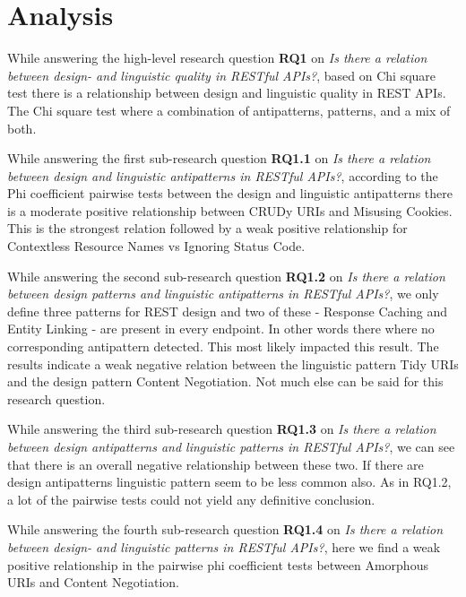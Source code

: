 \section{Analysis}

While answering the high-level research question  \textbf{RQ1} on \textit{Is there a relation between design- and linguistic quality in RESTful APIs?}, based on Chi square test there is a relationship between design and linguistic quality in REST APIs. The Chi square test where a combination of antipatterns, patterns, and a mix of both.

While answering the first sub-research question \textbf{RQ1.1} on \textit{Is there a relation between design and linguistic antipatterns in RESTful APIs?}, according to the Phi coefficient pairwise tests between the design and linguistic antipatterns there is a moderate positive relationship between CRUDy URIs and Misusing Cookies. This is the strongest relation followed by a weak positive relationship for Contextless Resource Names vs Ignoring Status Code.

While answering the second sub-research question \textbf{RQ1.2} on \textit{Is there a relation between design patterns and linguistic antipatterns in RESTful APIs?}, we only define three patterns for REST design and two of these - Response Caching and  Entity Linking - are present in every endpoint. In other words there where no corresponding antipattern detected. This most likely impacted this result. The results indicate a weak negative relation between the linguistic pattern Tidy URIs and the design pattern Content Negotiation. Not much else can be said for this research question.

While answering the third sub-research question  \textbf{RQ1.3} on \textit{Is there a relation between design antipatterns and linguistic patterns in RESTful APIs?}, we can see that there is an overall negative relationship between these two. If there are design antipatterns linguistic pattern seem to be less common also. As in RQ1.2, a lot of the pairwise tests could not yield any definitive conclusion.

While answering the fourth sub-research question \textbf{RQ1.4} on \textit{Is there a relation between design- and linguistic patterns in RESTful APIs?}, here we find a weak positive relationship in the pairwise phi coefficient tests between Amorphous URIs and Content Negotiation.

\newpage